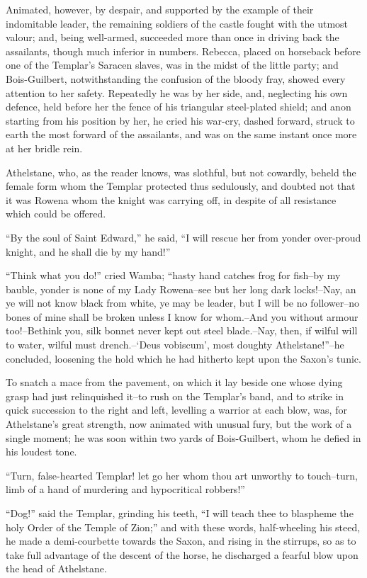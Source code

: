 Animated, however, by despair, and supported by the example of their
indomitable leader, the remaining soldiers of the castle fought with the
utmost valour; and, being well-armed, succeeded more than once in
driving back the assailants, though much inferior in numbers. Rebecca,
placed on horseback before one of the Templar's Saracen slaves, was in
the midst of the little party; and Bois-Guilbert, notwithstanding the
confusion of the bloody fray, showed every attention to her safety.
Repeatedly he was by her side, and, neglecting his own defence, held
before her the fence of his triangular steel-plated shield; and anon
starting from his position by her, he cried his war-cry, dashed forward,
struck to earth the most forward of the assailants, and was on the same
instant once more at her bridle rein.

Athelstane, who, as the reader knows, was slothful, but not cowardly,
beheld the female form whom the Templar protected thus sedulously, and
doubted not that it was Rowena whom the knight was carrying off, in
despite of all resistance which could be offered.

``By the soul of Saint Edward,'' he said, ``I will rescue her from
yonder over-proud knight, and he shall die by my hand!''

``Think what you do!'' cried Wamba; ``hasty hand catches frog for
fish--by my bauble, yonder is none of my Lady Rowena--see but her long
dark locks!--Nay, an ye will not know black from white, ye may be
leader, but I will be no follower--no bones of mine shall be broken
unless I know for whom.--And you without armour too!--Bethink you, silk
bonnet never kept out steel blade.--Nay, then, if wilful will to water,
wilful must drench.--`Deus vobiscum', most doughty Athelstane!''--he
concluded, loosening the hold which he had hitherto kept upon the
Saxon's tunic.

To snatch a mace from the pavement, on which it lay beside one whose
dying grasp had just relinquished it--to rush on the Templar's band, and
to strike in quick succession to the right and left, levelling a warrior
at each blow, was, for Athelstane's great strength, now animated with
unusual fury, but the work of a single moment; he was soon within two
yards of Bois-Guilbert, whom he defied in his loudest tone.

``Turn, false-hearted Templar! let go her whom thou art unworthy to
touch--turn, limb of a hand of murdering and hypocritical robbers!''

``Dog!'' said the Templar, grinding his teeth, ``I will teach thee to
blaspheme the holy Order of the Temple of Zion;'' and with these words,
half-wheeling his steed, he made a demi-courbette towards the Saxon, and
rising in the stirrups, so as to take full advantage of the descent of
the horse, he discharged a fearful blow upon the head of Athelstane.

